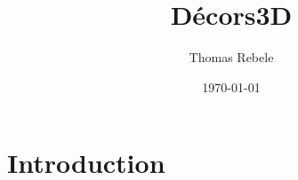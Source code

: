 \documentclass[8pt,twoside=off,titlepage=false, twocolumn]{scrartcl}
\begin{document}
\begin{titlepage}
\title{Décors3D}
\author{Thomas Rebele}
\date{\today}
\end{titlepage}

\begingroup
 \makeatletter
 \maketitle
\endgroup

\tableofcontents

\section{Introduction}




\nocite{*}

    
    
\end{document}
